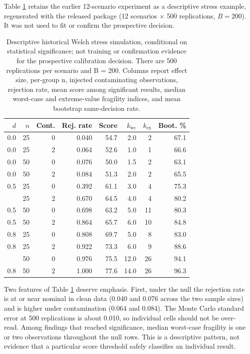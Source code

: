 Table \ref{tab:simtable} retains the earlier 12-scenario experiment as a
descriptive stress example, regenerated with the released package (12
scenarios \(\times\) 500 replications, \(B=200\)). It was not used to fit or
confirm the prospective decision.

\begin{table}

\caption{\label{tab:simtable}Descriptive historical Welch stress simulation, conditional on statistical significance; not training or confirmation evidence for the prospective calibration decision. There are 500 replications per scenario and B = 200. Columns report effect size, per-group n, injected contaminating observations, rejection rate, mean score among significant results, median worst-case and extreme-value fragility indices, and mean bootstrap same-decision rate.}
\centering
\begin{tabular}[t]{rrrrrrrr}
\toprule
$d$ & $n$ & Cont. & Rej. rate & Score & $k_{\mathrm{wc}}$ & $k_{\mathrm{ex}}$ & Boot. \%\\
\midrule
0.0 & 25 & 0 & 0.040 & 54.7 & 2.0 & 2 & 67.1\\
0.0 & 25 & 2 & 0.064 & 52.6 & 1.0 & 1 & 66.6\\
0.0 & 50 & 0 & 0.076 & 50.0 & 1.5 & 2 & 63.1\\
0.0 & 50 & 2 & 0.084 & 51.3 & 2.0 & 2 & 65.5\\
0.5 & 25 & 0 & 0.392 & 61.1 & 3.0 & 4 & 75.3\\
\addlinespace
0.5 & 25 & 2 & 0.670 & 64.5 & 4.0 & 4 & 80.2\\
0.5 & 50 & 0 & 0.698 & 63.2 & 5.0 & 11 & 80.3\\
0.5 & 50 & 2 & 0.864 & 65.7 & 6.0 & 10 & 84.8\\
0.8 & 25 & 0 & 0.808 & 69.7 & 5.0 & 8 & 83.0\\
0.8 & 25 & 2 & 0.922 & 73.3 & 6.0 & 9 & 88.6\\
\addlinespace
0.8 & 50 & 0 & 0.976 & 75.5 & 12.0 & 26 & 94.1\\
0.8 & 50 & 2 & 1.000 & 77.6 & 14.0 & 26 & 96.3\\
\bottomrule
\end{tabular}
\end{table}

Two features of Table \ref{tab:simtable} deserve emphasis. First, under the
null the rejection rate is at or near nominal in clean data
(0.040 and 0.076 across the two
sample sizes) and is higher under contamination
(0.064 and 0.084). The Monte Carlo
standard error at 500 replications is about 0.010, so individual
cells should not be over-read. Among findings that reached significance,
median worst-case fragility is one or two observations throughout the null
rows. This is a descriptive pattern, not evidence that a particular score
threshold safely classifies an individual result.

